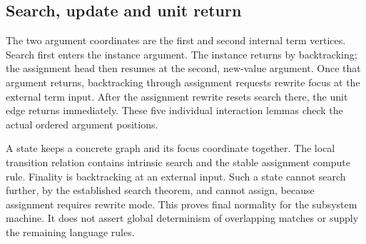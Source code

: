 


\subsection{Search, update and unit return}

The two argument coordinates are the first and second internal term
vertices. Search first enters the instance argument. The instance returns
by backtracking; the assignment head then resumes at the second, new-value
argument. Once that argument returns, backtracking through assignment
requests rewrite focus at the external term input. After the assignment
rewrite resets search there, the unit edge returns immediately. These five
individual interaction lemmas check the actual ordered argument positions.








A state keeps a concrete graph and its focus coordinate together. The local
transition relation contains intrinsic search and the stable assignment
compute rule. Finality is backtracking at an external input. Such a state
cannot search further, by the established search theorem, and cannot assign,
because assignment requires rewrite mode. This proves final normality for
the subsystem machine. It does not assert global determinism of overlapping
matches or supply the remaining language rules.


